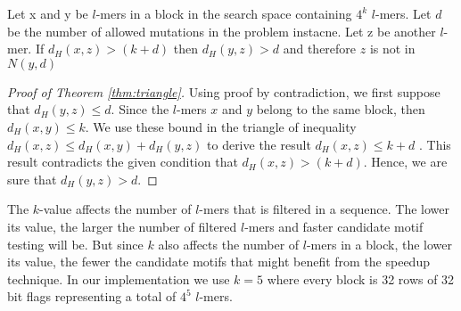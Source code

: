 \begin{thm} \label{thm:triangle}
	Let x and y be $l$-mers in a block in the search space containing $4^k$ $l$-mers. Let $d$ be the number of allowed mutations in the problem instacne. Let z be another $l$-mer. If $d_H(x, z) > (k + d)$ then $d_H(y, z) > d$ and therefore $z$ is not in $N(y, d)$
\end{thm}

\begin{proof}[Proof of Theorem \ref{thm:triangle}]
Using proof by contradiction, we first suppose that $d_H(y, z) \leq d$. Since the $l$-mers $x$ and $y$ belong to the same block, then $d_H(x, y) \leq k$. We use these bound in the triangle of inequality $d_H(x, z) \leq d_H(x, y) + d_H(y, z)$ to derive the result $d_H(x, z) \leq k + d$ . This result contradicts the given condition that $d_H(x, z) > (k + d)$. Hence, we are sure that $d_H(y, z) > d$.
\end{proof}

The $k$-value affects the number of $l$-mers that is filtered in a sequence. The lower its value, the larger the number of filtered $l$-mers and faster candidate motif testing will be. But since $k$ also affects the number of $l$-mers in a block, the lower its value, the fewer the candidate motifs that might benefit from the speedup technique. In our implementation we use $k = 5$ where every block is 32 rows of 32 bit flags representing a total of $4^5$ $l$-mers.

